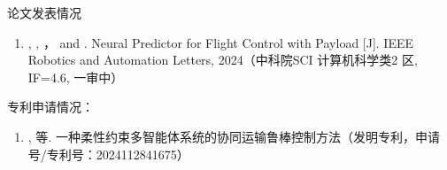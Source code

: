 \documentclass[lang=chs, degree=master, blindreview=true, winfonts=true]{yanputhesis}
\begin{document}
\begin{accomplishments}                                     %
	论文发表情况
	\begin{enumerate}
		\item {}, , ，  and . Neural Predictor for Flight Control with Payload [J].  IEEE Robotics
		and Automation Letters, 2024（中科院SCI 计算机科学类2 区, IF=4.6, 一审中）
	\end{enumerate}

    专利申请情况：
    \begin{enumerate}
    	\item {}, 等. 一种柔性约束多智能体系统的协同运输鲁棒控制方法（发明专利，申请号/专利号：2024112841675）
    \end{enumerate}
\end{accomplishments}                                       %
\makestatement                                              %
\end{document}
